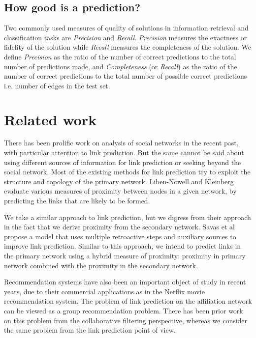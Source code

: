 \documentclass{report}
\begin{document}
\subsection{How good is a prediction?}
Two commonly used measures of quality of solutions in information retrieval and classification tasks are \textit{Precision} and \textit{Recall}. \textit{Precision} measures the exactness or fidelity of the solution while \textit{Recall} measures the completeness of the solution. We define \textit{Precision} as the ratio of the number of correct predictions to the total number of predictions made, and \textit{Completeness} (or \textit{Recall}) as the ratio of the number of correct predictions to the total number of possible correct predictions i.e. number of edges in the test set.

\section{Related work}
There has been prolific work on analysis of social networks in the recent past, with particular attention to link prediction. But the same cannot be said about using different sources of information for link prediction or seeking beyond the social network. Most of the existing methods for link prediction try to exploit the structure and topology of the primary network. Liben-Nowell and Kleinberg\cite{kleinberg} evaluate various measures of proximity between nodes in a given network, by predicting the links that are likely to be formed.

We take a similar approach to link prediction, but we digress from their approach in the fact that we derive proximity from the secondary network. Savas et al propose a model\cite{savasLinkPred} that uses multiple retroactive steps and auxiliary sources to improve link prediction. Similar to this approach, we intend to predict links in the primary network using a hybrid measure of proximity: proximity in primary network combined with the proximity in the secondary network.

Recommendation systems have also been an important object of study in recent years, due to their commercial applications as in the Netflix movie recommendation system. The problem of link prediction on the affiliation network can be viewed as a group recommendation problem. There has been prior work on this problem \cite{chen-orkutComm09} from the collaborative filtering perspective, whereas we consider the same problem from the link prediction point of view.
\end{document}
